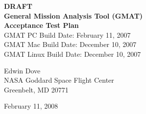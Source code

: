 \begin{center}
{\renewcommand{\thefootnote}{\fnsymbol{footnote}} { \huge \bf DRAFT
\\General Mission Analysis Tool (GMAT)\\ Acceptance Test Plan\\}
\vspace{0.1in} {GMAT PC Build Date: February 11, 2007}\\
\vspace{0.1in} {GMAT Mac Build Date: December 10, 2007}\\
\vspace{0.1in} {GMAT Linux Build Date: December 10, 2007}}
\end{center}

\begin{figure}[htbp!]
    \begin{center}
    \end{center}
\end{figure}

\begin{center}
Edwin Dove\\

NASA Goddard Space Flight Center\\
Greenbelt, MD 20771

February 11, 2008
\end{center}

\clearpage
\clearpage
